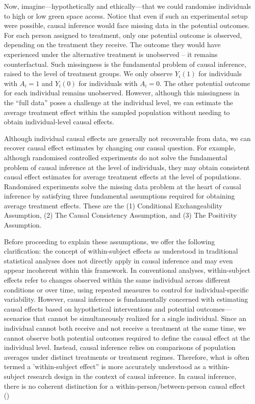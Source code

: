 \documentclass[
  singlecolumn]{article}
\begin{document}
Now, imagine---hypothetically and ethically---that we could randomise
individuals to high or low green space access. Notice that even if such
an experimental setup were possible, causal inference would face missing
data in the potential outcomes. For each person assigned to treatment,
only one potential outcome is observed, depending on the treatment they
receive. The outcome they would have experienced under the alternative
treatment is unobserved -- it remains counterfactual. Such missingness
is the fundamental problem of causal inference, raised to the level of
treatment groups. We only observe \(Y_i(1)\) for individuals with
\(A_i = 1\) and \(Y_i(0)\) for individuals with \(A_i = 0\). The other
potential outcome for each individual remains unobserved. However,
although this missingness in the ``full data'' poses a challenge at the
individual level, we can estimate the average treatment effect within
the sampled population without needing to obtain individual-level causal
effects.

Although individual causal effects are generally not recoverable from
data, we can recover causal effect estimates by changing our causal
question. For example, although randomised controlled experiments do not
solve the fundamental problem of causal inference at the level of
individuals, they may obtain consistent causal effect estimates for
average treatment effects at the level of populations. Randomised
experiments solve the missing data problem at the heart of causal
inference by satisfying three fundamental assumptions required for
obtaining average treatment effects. These are the (1) Conditional
Exchangeability Assumption, (2) The Causal Consistency Assumption, and
(3) The Positivity Assumption.

Before proceeding to explain these assumptions, we offer the following
clarification: the concept of within-subject effects as understood in
traditional statistical analyses does not directly apply in causal
inference and may even appear incoherent within this framework. In
conventional analyses, within-subject effects refer to changes observed
within the same individual across different conditions or over time,
using repeated measures to control for individual-specific variability.
However, causal inference is fundamentally concerned with estimating
causal effects based on hypothetical interventions and potential
outcomes---scenarios that cannot be simultaneously realized for a single
individual. Since an individual cannot both receive and not receive a
treatment at the same time, we cannot observe both potential outcomes
required to define the causal effect at the individual level. Instead,
causal inference relies on comparisons of population averages under
distinct treatments or treatment regimes. Therefore, what is often
termed a 'within-subject effect'' is more accurately understood as a
within-subject research design in the context of causal inference. In
causal inference, there is no coherent distinction for a
within-person/between-person causal effect
()
\end{document}
